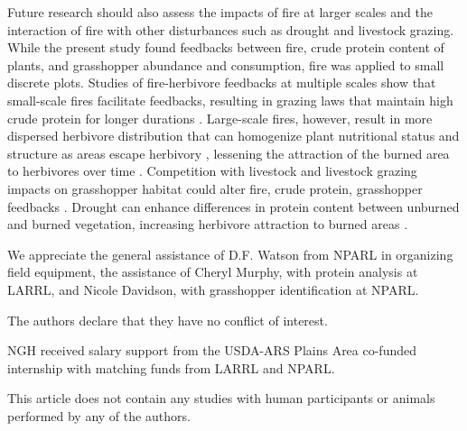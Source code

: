 \documentclass[referee, 
	            sn-basic]
           {sn-jnl}
\begin{document}
Future research should also assess the impacts of fire at larger scales and the interaction of fire with other disturbances such as drought and livestock grazing. While the present study found feedbacks between fire, crude protein content of plants, and grasshopper abundance and consumption, fire was applied to small discrete plots. Studies of fire-herbivore feedbacks at multiple scales show that small-scale fires facilitate feedbacks, resulting in grazing laws that maintain high crude protein for longer durations \citep{cromsigt2008}. Large-scale fires, however, result in more dispersed herbivore distribution that can homogenize plant nutritional status and structure as areas escape herbivory \citep{archibald2005}, lessening the attraction of the burned area to herbivores over time \citep{donaldson2018}. Competition with livestock and livestock grazing impacts on grasshopper habitat could alter fire, crude protein, grasshopper feedbacks \citep{onsager2000a, oneill2003}. Drought can enhance differences in protein content between unburned and burned vegetation, increasing herbivore attraction to burned areas \citep{augustine2014, yoganand2014}. 



\backmatter



We appreciate the general assistance of D.F. Watson from NPARL in organizing field equipment, the assistance of Cheryl Murphy, with protein analysis at LARRL, and Nicole Davidson, with grasshopper identification at NPARL. 



The authors declare that they have no conflict of interest.


NGH received salary support from the USDA-ARS Plains Area co-funded internship with matching funds from LARRL and NPARL. 


This article does not contain any studies with human participants or animals performed by any of the authors.  



\end{document}
